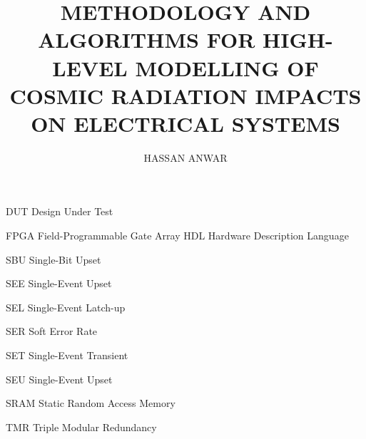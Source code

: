 \documentclass[letterpaper%
, twoside%
, 12pt%
,these%
, english%
,creativecommons,hyperref%
]{thETS}
\title{METHODOLOGY AND ALGORITHMS FOR HIGH-LEVEL MODELLING OF COSMIC
RADIATION IMPACTS ON ELECTRICAL SYSTEMS}
\author{HASSAN ANWAR}
\begin{document}

\maketitle

\presentjury

%
%



%
%
%



%
%







\tableofcontents
 
\listoftables


\listoffigures


\begin{listofabbr}[3cm]
\item [DUT]  Design Under Test 

\item [FPGA]  Field-Programmable Gate Array 
HDL Hardware Description Language 


\item [SBU] Single-Bit Upset 
\item [SEE] Single-Event Upset 
\item [SEL] Single-Event Latch-up 
\item [SER] Soft Error Rate 
\item [SET] Single-Event Transient 
\item [SEU] Single-Event Upset 
\item [SRAM] Static Random Access Memory 
\item [TMR] Triple Modular Redundancy 
\end{listofabbr}
\end{document}
